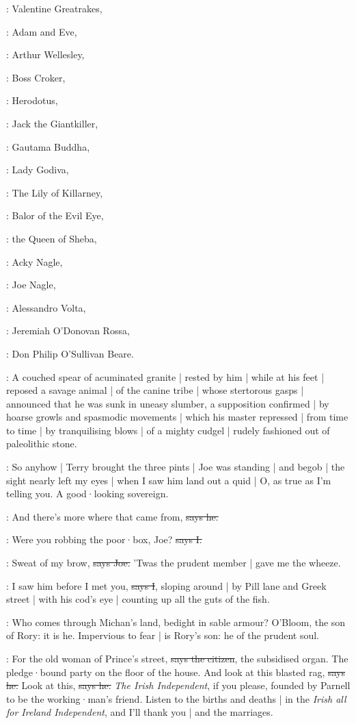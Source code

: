 :
Valentine Greatrakes,

:
Adam and Eve,

:
Arthur Wellesley,

:
Boss Croker,

:
Herodotus,

:
Jack the Giantkiller,

:
Gautama Buddha,

:
Lady Godiva,

:
The Lily of Killarney,

:
Balor of the Evil Eye,

:
the Queen of Sheba,

:
Acky Nagle,

:
Joe Nagle,

:
Alessandro Volta,

:
Jeremiah O'Donovan Rossa,

:
Don Philip O'Sullivan Beare.

:
A couched spear of acuminated granite |
rested by him
 |
while at his feet |
reposed a savage animal |
of the canine tribe |
whose stertorous gasps |
announced that he was sunk in uneasy slumber,
a supposition confirmed |
by hoarse growls and spasmodic movements |
which his master repressed |
from time to time |
by tranquilising blows |
of a mighty cudgel |
rudely fashioned out of paleolithic stone.

\Nq:
So anyhow |
Terry brought the three pints |
Joe was standing |
and begob |
the sight nearly left my eyes |
when I saw him land out a quid |
O,
as true as I'm telling you.
A good·looking sovereign.

\joe:
And there's more where that came from,
\sout{says he.}

:
Were you robbing the poor·box,
Joe?
\sout{says I.}

\joe:
Sweat of my brow,
\sout{says Joe.}
'Twas the prudent member |
gave me the wheeze.

:
I saw him before I met you,
\sout{says I},
sloping around |
by Pill lane and Greek street |
with his cod's eye |
counting up all the guts of the fish.

:
Who comes through Michan's land,
bedight in sable armour?
O'Bloom,
the son of Rory:
it is he.
Impervious to fear |
is Rory's son:
he of the prudent soul.

\citizen:
For the old woman of Prince's street,
\sout{says the citizen},
the subsidised organ.
The pledge·bound party on the floor of the house.
And look at this blasted rag,
\sout{says he.}
%
Look at this,
\sout{says he.}
\emph{The Irish Independent},
if you please,
founded by Parnell to be the working·man's friend.
Listen to the births and deaths |
in the \emph{Irish all for Ireland Independent},
and I'll thank you |
and the marriages.

